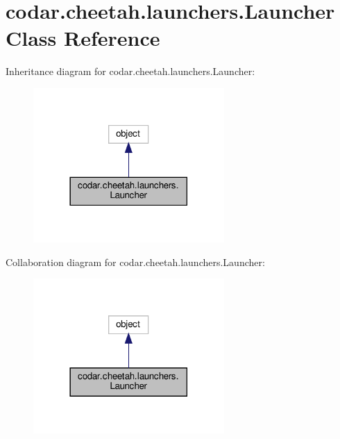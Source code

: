 \hypertarget{classcodar_1_1cheetah_1_1launchers_1_1_launcher}{}\section{codar.\+cheetah.\+launchers.\+Launcher Class Reference}
\label{classcodar_1_1cheetah_1_1launchers_1_1_launcher}


Inheritance diagram for codar.\+cheetah.\+launchers.\+Launcher\+:
\nopagebreak
\begin{figure}[H]
\begin{center}
\leavevmode
\includegraphics[width=206pt]{classcodar_1_1cheetah_1_1launchers_1_1_launcher__inherit__graph}
\end{center}
\end{figure}


Collaboration diagram for codar.\+cheetah.\+launchers.\+Launcher\+:
\nopagebreak
\begin{figure}[H]
\begin{center}
\leavevmode
\includegraphics[width=206pt]{classcodar_1_1cheetah_1_1launchers_1_1_launcher__coll__graph}
\end{center}
\end{figure}
